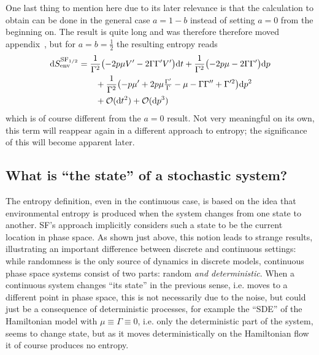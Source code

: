 One last thing to mention here due to its later relevance is that the calculation to obtain  can be done in the general case \(a = 1-b\) instead of setting \(a=0\) from the beginning on. The result is quite long and was therefore therefore moved appendix~, but for \(a = b = \frac12\) the resulting entropy reads
%
\begin{equation}\begin{split}
	\label{eqn:sf entropy production 1/2}
	\mathrm{d}S_\text{env}^{\text{SF}_{1/2}} &=
	\frac1{\Gamma^2}\bigl(-2p\mu V'-2\Gamma\Gamma'V'\bigr)\mathrm{d} t
	+ \frac1{\Gamma^2}\bigl(-2p\mu-2\Gamma\Gamma'\bigr)\mathrm{d} p
	\\&\qquad
	+ \frac1{\Gamma^2}\bigl( -p\mu' + 2p\mu \tfrac{\Gamma'}\Gamma - \mu - \Gamma\Gamma'' + \Gamma'^2 \bigr) \mathrm{d} p^2
	\\&\qquad
	+ \mathcal{O}(\mathrm{d} t^2) + \mathcal{O}(\mathrm{d} p^3)
\end{split}\end{equation}
%
which is of course different from the \(a = 0\) result. Not very meaningful on its own, this term will reappear again in a different approach to entropy; the significance of this will become apparent later.




\subsection{What is ``the state'' of a stochastic system?}

The entropy definition, even in the continuous case, is based on the idea that environmental entropy is produced when the system changes from one state to another. SF's approach implicitly considers such a state to be the current location in phase space. As shown just above, this notion leads to strange results, illustrating an important difference between discrete and continuous settings: while randomness is the only source of dynamics in discrete models, continuous phase space systems consist of two parts: random \emph{and deterministic}.
When a continuous system changes ``its state'' in the previous sense, i.e. moves to a different point in phase space, this is not necessarily due to the noise, but could just be a consequence of deterministic processes, for example the ``SDE'' of the Hamiltonian model  with \(\mu \equiv \Gamma \equiv 0\), i.e. only the deterministic part of the system, seems to change state, but as it moves deterministically on the Hamiltonian flow it of course produces no entropy.

